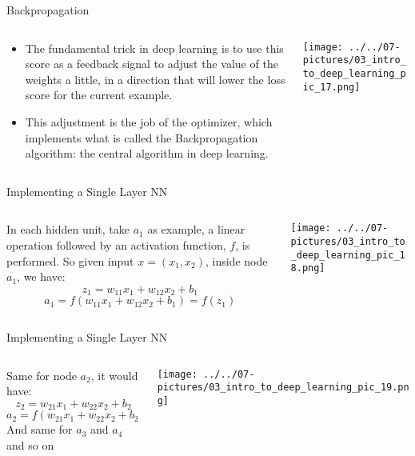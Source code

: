 \documentclass[11pt]{beamer}
\begin{document}
\begin{frame}{Backpropagation}
\begin{columns}[T] %
\begin{column}{.48\textwidth}
        \begin{itemize}
		\item The fundamental trick in deep learning is to use this score as a feedback signal to adjust the value of the weights a little, in a direction that will lower the loss score for the current example. 
		\item This adjustment is the job of the optimizer, which implements what is called the Backpropagation algorithm: the central algorithm in deep learning.
        \end{itemize}
\end{column}%
\hfill%
\begin{column}{.48\textwidth}
        \texttt{[image: ../../07-pictures/03\_intro\_to\_deep\_learning\_pic\_17.png]}
\end{column}%
\end{columns}
\end{frame}
\begin{frame}{Implementing a Single Layer NN}
\begin{columns}[T] %
\begin{column}{.48\textwidth}
		In each hidden unit, take $a_1$ as example, a linear operation followed by an activation function, $f$, is performed. So given input $x = (x_1, x_2)$, inside node $a_1$, we have:
		$$z_1 = w_{11}x_1 + w_{12}x_2 + b_1$$
		$$a_1 = f(w_{11}x_1 + w_{12}x_2 + b_1) = f(z_1) $$
\end{column}%
\hfill%
\begin{column}{.48\textwidth}
        \texttt{[image: ../../07-pictures/03\_intro\_to\_deep\_learning\_pic\_18.png]}
\end{column}%
\end{columns}
\end{frame}
\begin{frame}{Implementing a Single Layer NN}
\begin{columns}[T] %
\begin{column}{.48\textwidth}
		Same for node $a_2$, it would have:
		$$z_2 = w_{21}x_1 + w_{22}x_2 + b_2$$
		$$a_2  = f(w_{21}x_1 + w_{22}x_2 + b_2) = f(z_2)$$
		And same for $a_3$ and $a_4$ and so on
\end{column}%
\hfill%
\begin{column}{.48\textwidth}
        \texttt{[image: ../../07-pictures/03\_intro\_to\_deep\_learning\_pic\_19.png]}
\end{column}%
\end{columns}
\end{frame}
\end{document}
